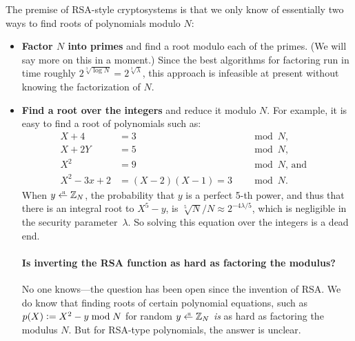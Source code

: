 The premise of RSA-style cryptosystems is that we only
know of essentially two ways to find roots of polynomials modulo $N$:
\begin{itemize}
\item \textbf{Factor $N$ into primes} and find a root modulo each of the primes.
      (We will say more on this in a moment.)
      Since the best algorithms for factoring run in time roughly $2^{\sqrt[3]{\log N}} = 2^{\sqrt[3]{\lambda}}$,
      this approach is infeasible at present without knowing the factorization of $N$.

\item \textbf{Find a root over the integers} and reduce it modulo $N$.
      For example, it is easy to find a root of polynomials such as:\\
\begin{align*}
  X + 4 &= 3 &&\mod N,&\\
  X + 2Y &= 5 &&\mod N,&\\
  X^2 &= 9 &&\mod N\text{, and}&\\
  X^2-3x+2 &= (X-2)(X-1) = 3 &&\mod N.
\end{align*}
When $y \getsr \Z_N$, the probability that $y$ is a perfect
5-th power, and thus that there is an integral root to $X^5 - y$,
is $\sqrt[5]{N}/N \approx 2^{-4\lambda/5}$, which is negligible
in the security parameter~$\lambda$.
So solving this equation over the integers is a dead end.

\paragraph{Is inverting the RSA function as hard as factoring the modulus?}
No one knows---the question has been open since the invention of RSA.
We do know that finding roots of certain polynomial equations, such as
$p(X) \mathrel{\mathop:}= X^2 - y \bmod N$ for random $y \getsr \Z_N$ \emph{is} as 
hard as factoring the modulus $N$.
But for RSA-type polynomials, the answer is unclear.

\end{itemize}

